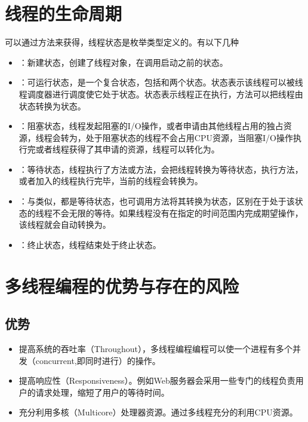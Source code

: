 \documentclass[a4paper]{report}
\begin{document}
\section{线程的生命周期}
可以通过方法来获得，线程状态是枚举类型定义的。有以下几种
\begin{itemize}
  \item {}：新建状态，创建了线程对象，在调用启动之前的状态。
  \item {}：可运行状态，是一个复合状态，包括和两个状态。状态表示该线程可以被线程调度器进行调度使它处于状态。状态表示线程正在执行，方法可以把线程由状态转换为状态。
  \item {}：阻塞状态，线程发起阻塞的I/O操作，或者申请由其他线程占用的独占资源，线程会转为，处于阻塞状态的线程不会占用CPU资源，当阻塞I/O操作执行完或者线程获得了其申请的资源，线程可以转化为。
  \item {}：等待状态，线程执行了方法或方法，会把线程转换为等待状态，执行方法，或者加入的线程执行完毕，当前的线程会转换为。
  \item {}：与类似，都是等待状态，也可调用方法将其转换为状态，区别在于处于该状态的线程不会无限的等待。如果线程没有在指定的时间范围内完成期望操作，该线程就会自动转换为。
  \item {}：终止状态，线程结束处于终止状态。
\end{itemize}
\section{多线程编程的优势与存在的风险}
\subsection{优势}
\begin{itemize}
  \item 提高系统的吞吐率（Throughout），多线程编程编程可以使一个进程有多个并发（concurrent,即同时进行）的操作。
  \item 提高响应性（Responsiveness）。例如Web服务器会采用一些专门的线程负责用户的请求处理，缩短了用户的等待时间。
  \item 充分利用多核（Multicore）处理器资源。通过多线程充分的利用CPU资源。
\end{itemize}
\end{document}
